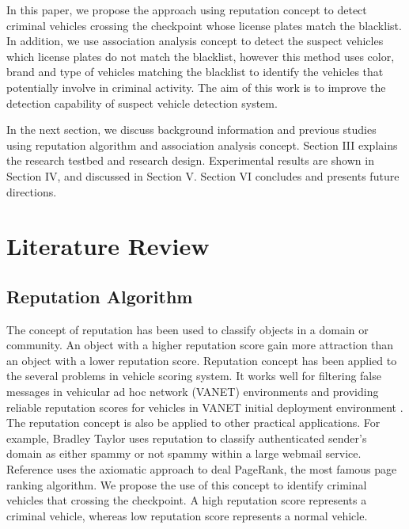 In this paper, we propose the approach using reputation concept to detect criminal vehicles crossing the checkpoint whose license plates match the blacklist. 
In addition, we use association analysis concept to detect the suspect vehicles which license plates do not match the blacklist, however this method uses color, brand and type of vehicles matching the blacklist to identify the vehicles that potentially involve in criminal activity.
The aim of this work is to improve the detection capability of suspect vehicle detection system.

In the next section, we discuss background information and previous studies using reputation algorithm and association analysis concept. Section III explains the research testbed and research design. Experimental results are shown in Section IV, and discussed in Section V. Section VI concludes and presents future directions.

\section{Literature Review}
\label{sec:2}

\subsection{Reputation Algorithm}
\label{sec:3}
The concept of reputation has been used to classify objects in a domain or community. 
An object with a higher reputation score gain more attraction than an object with a lower reputation score.  
Reputation concept has been applied to the several problems in vehicle scoring system.  
It works well for filtering false messages in vehicular ad hoc network (VANET) environments \cite{ding} and providing reliable reputation scores for vehicles in VANET initial deployment environment \cite{park}.
The reputation concept is also be applied to other practical applications. For example, Bradley Taylor \cite{DBLP:taylor} uses reputation to classify authenticated sender's domain as either spammy or not spammy within a large webmail service.  Reference \cite{altman} uses the axiomatic approach to deal PageRank, the most famous page ranking algorithm.
We propose the use of this concept to identify criminal vehicles that crossing the checkpoint. 
A high reputation score represents a criminal vehicle, whereas low reputation score represents a normal vehicle.

